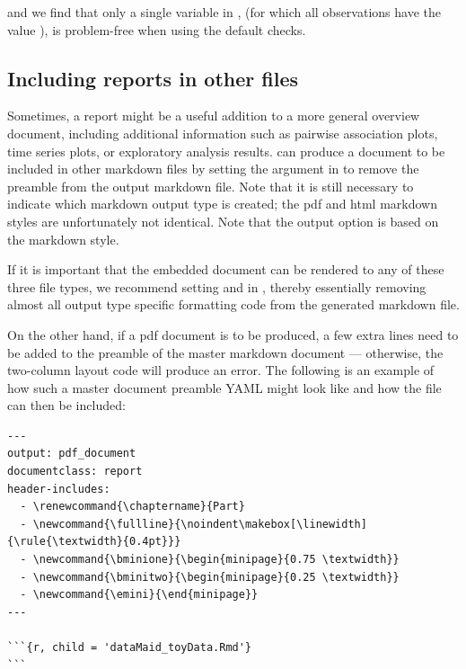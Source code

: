\documentclass[article,shortnames]{jss}
\begin{document}
and we find that only a single variable in ,  (for which all
observations have the value ), is problem-free when using the default checks.


\subsection[Including dataMaid reports in other files]{Including  reports in other files}
Sometimes, a  report might be a useful addition to a
more general overview document, including additional information such
as pairwise association plots, time series plots, or exploratory
analysis results.   can produce a document to be
included in other  markdown files by setting the
 argument in  to remove the preamble
from the output  markdown file. Note that it is still
necessary to indicate which  markdown output type is
created; the pdf and html  markdown styles are
unfortunately not identical. Note that the  output option is based on the  markdown style. 

If it is important that the embedded  document can be
rendered to any of these three file types, we recommend setting
 and  in , thereby
essentially removing almost all output type specific formatting code
from the generated  markdown file.

On the other hand, if a pdf document is to be produced, a few extra
lines need to be added to the preamble of the master  markdown
document --- otherwise, the two-column layout code will produce an
error. The following is an example of how such a master document
preamble YAML might look like and how the  file can
then be included:

{\small
\begin{Verbatim}
---
output: pdf_document
documentclass: report
header-includes:
  - \renewcommand{\chaptername}{Part}
  - \newcommand{\fullline}{\noindent\makebox[\linewidth]{\rule{\textwidth}{0.4pt}}}
  - \newcommand{\bminione}{\begin{minipage}{0.75 \textwidth}}
  - \newcommand{\bminitwo}{\begin{minipage}{0.25 \textwidth}}
  - \newcommand{\emini}{\end{minipage}}
---

```{r, child = 'dataMaid_toyData.Rmd'}
```
\end{Verbatim}
}
\end{document}
